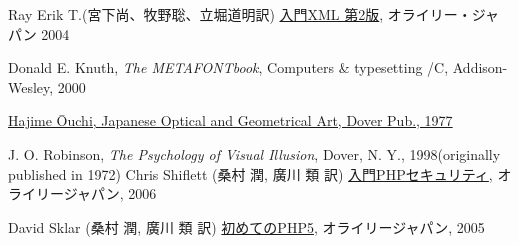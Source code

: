 \begin{thebibliography}{99}
\iffalse
 \bibitem{SVGECMAScript}
\href{http://www.w3.org/TR/SVG11/ecmascript-binding.html}
      {ECMAScript Language Binding for SVG}, \newline
      {\texttt{http://www.w3.org/TR/SVG11/ecmascript-binding.html}}
\fi

  Ray Erik T.(宮下尚、牧野聡、立堀道明訳)
\href{http://www.amazon.co.jp/exec/obidos/ASIN/4873111846/qid=1144562915/sr=1-19/br_lfbnb_b_19/503-6113071-5894369}{入門XML 第2版}, オライリー・ジャパン 2004
\iffalse
 \bibitem{JQUERY}jQuery Community Experts (株式会社クイープ 訳), \href{http://www.amazon.co.jp/jQuery%E3%82%AF%E3%83%83%E3%82%AF%E3%83%96%E3%83%83%E3%82%AF-jQuery-Community-Experts/dp/4873114683/ref=sr_1_4?ie=UTF8&qid=1304690839&sr=8-4g}
{jQueryクックブック}, オライリージャパン, 2010 
\fi
  Donald E. Knuth, {\it The METAFONTbook}, Computers \&
	typesetting /C, Addison-Wesley, 2000

\href{http://www.amazon.co.jp/Japanese-Optical-Geometrical-Pictorial-Archives/dp/048623553X/ref=sr_1_8?ie=UTF8&s=english-books&qid=1206946932&sr=8-8}
{Hajime \=Ouchi, Japanese Optical and Geometrical Art, Dover Pub., 1977 }

\iffalse
\bibitem{FirstJS}
Shelley Powers, (武舎 広幸、 武舎 るみ訳) 
\href{http://www.amazon.co.jp/初めてのJavaScript—Ajax-DOM対応-Shelley-Powers/dp/4873113229/ref=pd_bbs_sr_1?ie=UTF8&s=books&qid=1202533717&sr=8-1}
{初めてのJavaScript—Ajax\&DOM対応}, オライリー・ジャパン(2007)
\fi
 J. O. Robinson, {\it The Psychology of Visual
	 Illusion}, Dover, N. Y., 1998(originally published in 1972)
 Chris Shiflett (桑村 潤, 廣川 類 訳)
\href{http://www.amazon.co.jp/入門PHPセキュリティ-クリス-シフレット/dp/4873112869/ref=sr_1_2?ie=UTF8&s=books&qid=1208069132&sr=1-2}
     {入門PHPセキュリティ}, オライリージャパン, 2006

 David Sklar (桑村 潤, 廣川 類 訳)
\href{http://www.amazon.co.jp/exec/obidos/ASIN/4873112575/qid=1147606829/sr=1-8/ref=sr_1_10_8/250-1416174-1608245}
	 {初めてのPHP5}, オライリージャパン, 2005


\end{thebibliography}
